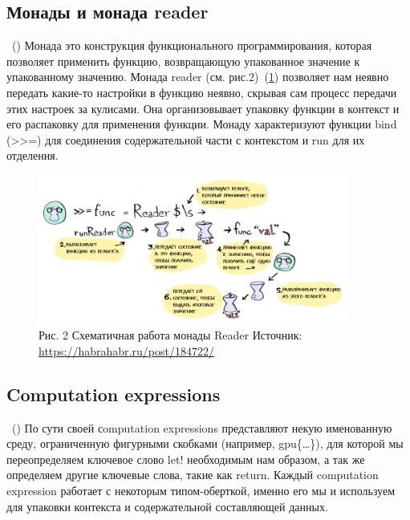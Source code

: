 \documentclass[14pt]{matmex-diploma-custom}
\begin{document}
\subsection {Монады и монада reader}~(\cite{habrahabr})
Монада это конструкция функционального программирования, которая позволяет применить функцию, возвращающую упакованное значение к упакованному значению.
Монада reader (см. рис.2)~(\ref{reader}) позволяет нам неявно передать какие-то настройки в функцию неявно, скрывая сам процесс передачи этих настроек за кулисами. Она организовывает упаковку функции в контекст и его распаковку для применения функции. Монаду характеризуют функции bind (>>=) для соединения содержательной части с контекстом и run для их отделения.
\begin{figure}[h] 
\label{reader}
\centering 
\includegraphics[width=0.9\textwidth]{images/reader} 
\caption{Рис. 2 Схематичная работа монады Reader
Источник: \url{https://habrahabr.ru/post/184722/}
} 
\end{figure}
\subsection{Computation expressions}~(\cite{fsffap})
По сути своей сomputation expressions представляют некую именованную среду, ограниченную фигурными скобками (например, gpu\{\ldots\}), для которой мы переопределяем ключевое слово let! необходимым нам образом, а так же определяем другие ключевые слова, такие как return. 
Каждый computation expression работает с некоторым типом-оберткой, именно его мы и используем для упаковки контекста и содержательной составляющей данных.
\end{document}
